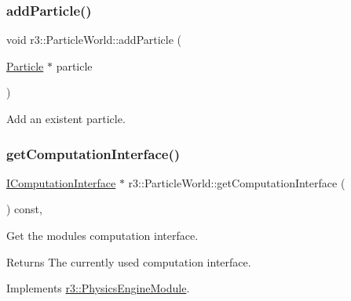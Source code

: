 \subsubsection{\texorpdfstring{add\+Particle()}{addParticle()}}
{\footnotesize\ttfamily void r3\+::\+Particle\+World\+::add\+Particle (\begin{DoxyParamCaption}\item[{\mbox{\hyperlink{classr3_1_1_particle}{Particle}} $\ast$}]{particle }\end{DoxyParamCaption})}



Add an existent particle. 

\mbox{\label{classr3_1_1_particle_world_a1e806bf89ec6445a54b9534f1efc081f}} 
\subsubsection{\texorpdfstring{get\+Computation\+Interface()}{getComputationInterface()}}
{\footnotesize\ttfamily \mbox{\hyperlink{classr3_1_1_i_computation_interface}{I\+Computation\+Interface}} $\ast$ r3\+::\+Particle\+World\+::get\+Computation\+Interface (\begin{DoxyParamCaption}{ }\end{DoxyParamCaption}) const\hspace{0.3cm}{\ttfamily [override]}, {\ttfamily [virtual]}}



Get the module\textquotesingle{}s computation interface. 

\begin{DoxyReturn}{Returns}
The currently used computation interface. 
\end{DoxyReturn}


Implements \mbox{\hyperlink{classr3_1_1_physics_engine_module_a3b1d0d9bea0a82534f367f6d728312d3}{r3\+::\+Physics\+Engine\+Module}}.

\mbox{\label{classr3_1_1_particle_world_a85fc9fcf5c51a5bbce206a35a82f8ccf}} 
